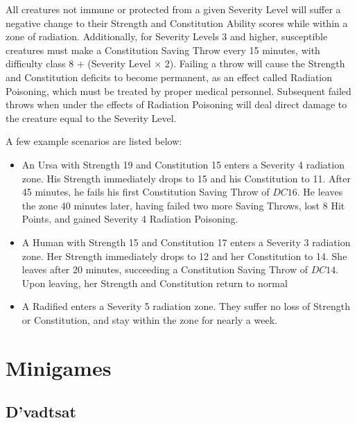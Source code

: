 \documentclass[12pt, twoside]{article}
\begin{document}
\begin{FlushLeft}
\begin{multicols}{2}
			All creatures not immune or protected from a given Severity Level will suffer a negative change to their Strength and Constitution Ability scores while within a zone of radiation.
			Additionally, for Severity Levels 3 and higher, susceptible creatures must make a Constitution Saving Throw every 15 minutes, with difficulty class 8 + (Severity Level $\times$ 2).
			Failing a throw will cause the Strength and Constitution deficits to become permanent, as an effect called Radiation Poisoning, which must be treated by proper medical personnel.
			Subsequent failed throws when under the effects of Radiation Poisoning will deal direct damage to the creature equal to the Severity Level.
			\vfill \null \columnbreak

			A few example scenarios are listed below:
			\begin{itemize}
				\item An Ursa with Strength 19 and Constitution 15 enters a Severity 4 radiation zone.
				His Strength immediately drops to 15 and his Constitution to 11.
				After 45 minutes, he fails his first Constitution Saving Throw of $DC16$.
				He leaves the zone 40 minutes later, having failed two more Saving Throws, lost 8 Hit Points, and gained Severity 4 Radiation Poisoning.
				\item A Human with Strength 15 and Constitution 17 enters a Severity 3 radiation zone.
				Her Strength immediately drops to 12 and her Constitution to 14.
				She leaves after 20 minutes, succeeding a Constitution Saving Throw of $DC14$.
				Upon leaving, her Strength and Constitution return to normal
				\item A Radified enters a Severity 5 radiation zone.
				They suffer no loss of Strength or Constitution, and stay within the zone for nearly a week.

			\end{itemize}
			\vfill \pagebreak

			\section{Minigames}

			\subsection{D'vadtsat}


\end{multicols}
\end{FlushLeft}
\end{document}
